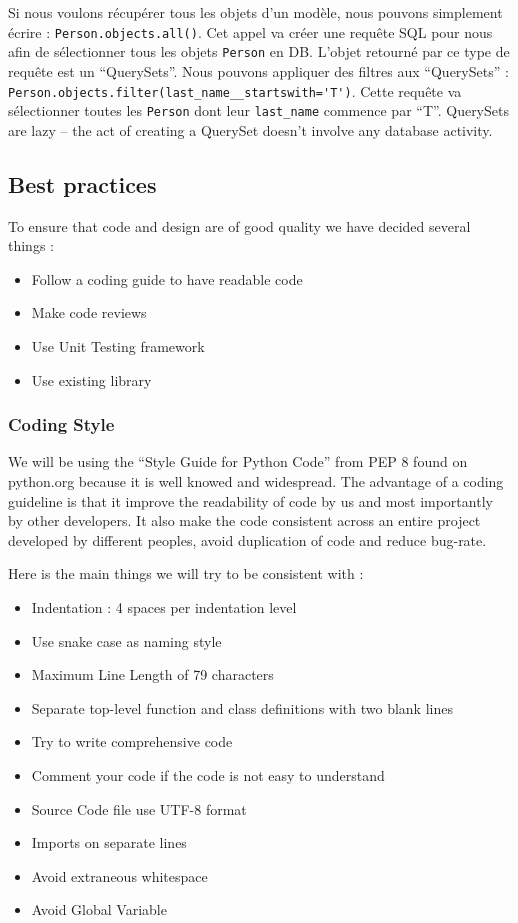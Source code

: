 \documentclass[11pt, a4paper]{article}   	%
\begin{document}
Si nous voulons récupérer tous les objets d'un modèle, nous pouvons simplement écrire : \lstinline{Person.objects.all()}.
Cet appel va créer une requête SQL pour nous afin de sélectionner tous les objets \texttt{Person} en DB.
L'objet retourné par ce type de requête est un \enquote{QuerySets}.
Nous pouvons appliquer des filtres aux \enquote{QuerySets} : \lstinline{Person.objects.filter(last_name__startswith='T')}.
Cette requête va sélectionner toutes les \texttt{Person} dont leur \texttt{last\_name} commence par \enquote{T}.
QuerySets are lazy – the act of creating a QuerySet doesn’t involve any database activity.





\subsection{Best practices}

To ensure that code and design are of good quality we have decided several things :


\begin{itemize}
\item Follow a coding guide to have readable code
\item Make code reviews
\item Use Unit Testing framework
\item Use existing library
\end{itemize} 

\subsubsection{Coding Style}
	
We will be using the \enquote{Style Guide for Python Code} from PEP 8 found on python.org because it is well knowed and widespread. 
The advantage of a coding guideline is that it improve the readability of code by us and most importantly by other developers. 
It also make the code consistent across an entire project developed by different peoples, avoid duplication of code and reduce bug-rate. 
 
Here is the main things we will try to be consistent with : 

\begin{itemize}
\item Indentation : 4 spaces per indentation level
\item Use snake case as naming style
\item Maximum Line Length of 79 characters
\item Separate top-level function and class definitions with two blank lines
\item Try to write comprehensive code
\item Comment your code if the code is not easy to understand
\item Source Code file use UTF-8 format
\item Imports on separate lines
\item Avoid extraneous whitespace
\item Avoid Global Variable
\end{itemize} 
\end{document}
